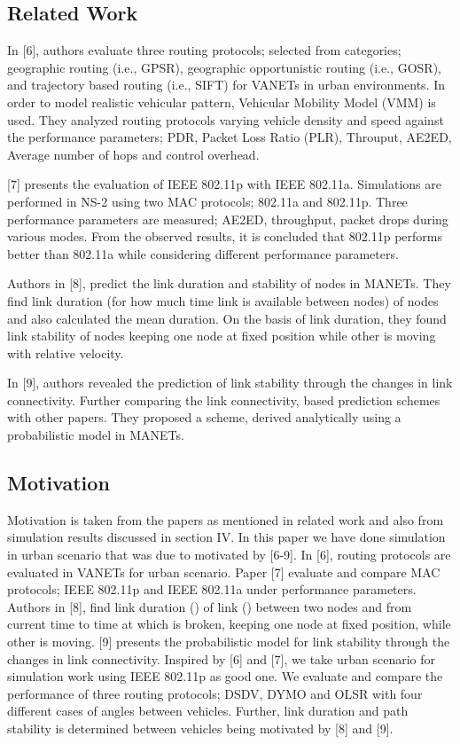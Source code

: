 \documentclass[journal]{IEEEtran}
\begin{document}
\subsection{Related Work}
In [6], authors evaluate three routing protocols; selected from categories; geographic routing (i.e., GPSR), geographic opportunistic routing (i.e., GOSR), and trajectory based routing (i.e., SIFT) for VANETs in urban environments. In order to model realistic vehicular pattern, Vehicular Mobility Model (VMM) is used. They analyzed routing protocols varying vehicle density and speed against the performance parameters; PDR,  Packet Loss Ratio (PLR), Throuput, AE2ED, Average number of hops and control overhead.

[7] presents the evaluation of IEEE 802.11p with IEEE 802.11a. Simulations are performed in NS-2 using two MAC protocols; 802.11a and 802.11p. Three performance parameters are measured; AE2ED, throughput, packet drops during various modes. From the observed results, it is concluded that 802.11p performs better than 802.11a while considering different performance parameters.

Authors in [8], predict the link duration and stability of nodes in MANETs. They find link duration (for how much time link is available between nodes) of nodes and also calculated the mean duration. On the basis of link duration, they found link stability of nodes keeping one node at fixed position while other is moving with relative velocity.

In [9], authors revealed the prediction of link stability through the changes in link connectivity. Further comparing the link connectivity, based prediction schemes with other papers. They proposed a scheme, derived analytically using a probabilistic model in MANETs.

\subsection{Motivation}
Motivation is taken from the papers as mentioned in related work and also from simulation results discussed in section IV. In this paper we have done simulation in urban scenario that was due to motivated by [6-9]. In [6], routing protocols are evaluated in VANETs for urban scenario. Paper [7] evaluate and compare MAC protocols; IEEE 802.11p and IEEE 802.11a under performance parameters. Authors in [8], find link duration () of link () between two nodes  and  from current time  to time at which  is broken, keeping one node at fixed position, while other is moving. [9] presents the probabilistic model for link stability through the changes in link connectivity. Inspired by [6] and [7], we take urban scenario for simulation work using IEEE 802.11p as good one. We evaluate and compare the performance of three routing protocols; DSDV, DYMO and OLSR with four different cases of angles between vehicles. Further, link duration and path stability is determined between vehicles being motivated by [8] and [9].
\end{document}
